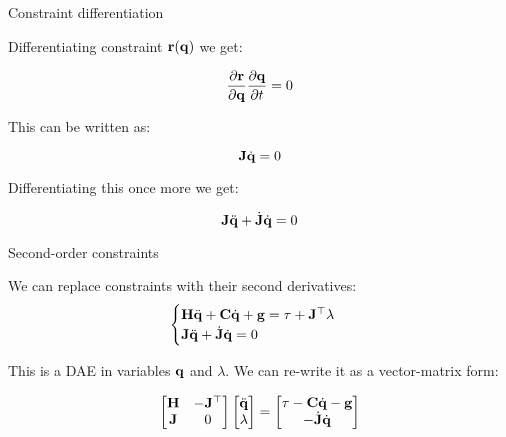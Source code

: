 \documentclass{beamer}
\begin{document}
\begin{frame}{Constraint differentiation}
	\begin{flushleft}
		
		Differentiating constraint $\mathbf{r}(\mathbf{q})$ we get:
		
		\begin{equation}
			\frac{\partial \mathbf{r}}{\partial \mathbf{q}} \frac{\partial \mathbf{q}}{\partial t} = 0
		\end{equation}
	
		This can be written as:
		
		\begin{equation}
			\mathbf{J} \dot{\mathbf{q}} = 0
		\end{equation}
		
		Differentiating this once more we get:
		
		\begin{equation}
			\mathbf{J} \ddot{\mathbf{q}} + \dot{\mathbf{J}} \dot{\mathbf{q}}= 0
		\end{equation}
		
	\end{flushleft}
\end{frame}



\begin{frame}{Second-order constraints}
	\begin{flushleft}
		
		We can replace constraints with their second derivatives:
		\begin{equation}
			\begin{cases}
				\mathbf{H} \ddot{\mathbf{q}} + \mathbf{C} \dot{\mathbf{q}} + \mathbf{g} = \tau + \mathbf{J}^\top \lambda
				\\
				\mathbf{J} \ddot{\mathbf{q}} + \dot{\mathbf{J}} \dot{\mathbf{q}}= 0
			\end{cases}
		\end{equation}
	
		This is a DAE in variables $\mathbf{q}$ and $\lambda$. We can re-write it as a vector-matrix form:
		
		\begin{equation}
		\begin{bmatrix}
		\mathbf{H} & -\mathbf{J}^\top \\
		\mathbf{J} & 0
	\end{bmatrix}
\begin{bmatrix}
\ddot{\mathbf{q}} \\
\lambda
\end{bmatrix}
=
\begin{bmatrix}
	\tau - \mathbf{C} \dot{\mathbf{q}} - \mathbf{g} \\
	-\dot{\mathbf{J}} \dot{\mathbf{q}}
\end{bmatrix}
		\end{equation}
		
	\end{flushleft}
\end{frame}
\end{document}
